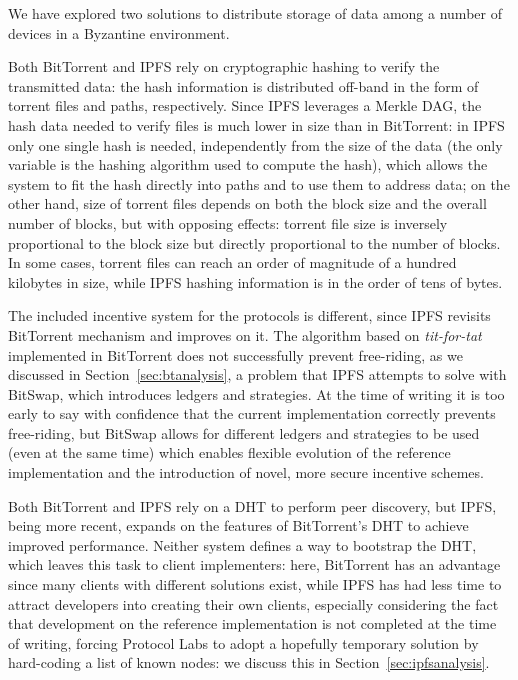 \documentclass[mscthesis]{usiinfthesis}
\begin{document}
We have explored two solutions to distribute storage of data among a number of devices in a Byzantine environment.

Both BitTorrent and IPFS rely on cryptographic hashing to verify the transmitted data: the hash information is distributed off-band in the form of torrent files and paths, respectively. Since IPFS leverages a Merkle DAG, the hash data needed to verify files is much lower in size than in BitTorrent: in IPFS only one single hash is needed, independently from the size of the data (the only variable is the hashing algorithm used to compute the hash), which allows the system to fit the hash directly into paths and to use them to address data; on the other hand, size of torrent files depends on both the block size and the overall number of blocks, but with opposing effects: torrent file size is inversely proportional to the block size but directly proportional to the number of blocks. In some cases, torrent files can reach an order of magnitude of a hundred kilobytes in size, while IPFS hashing information is in the order of tens of bytes.

The included incentive system for the protocols is different, since IPFS revisits BitTorrent mechanism and improves on it. The algorithm based on \textit{tit-for-tat} implemented in BitTorrent does not successfully prevent free-riding, as we discussed in Section~\ref{sec:btanalysis}, a problem that IPFS attempts to solve with BitSwap, which introduces ledgers and strategies. At the time of writing it is too early to say with confidence that the current implementation correctly prevents free-riding, but BitSwap allows for different ledgers and strategies to be used (even at the same time) which enables flexible evolution of the reference implementation and the introduction of novel, more secure incentive schemes.

Both BitTorrent and IPFS rely on a DHT to perform peer discovery, but IPFS, being more recent, expands on the features of BitTorrent's DHT to achieve improved performance. Neither system defines a way to bootstrap the DHT, which leaves this task to client implementers: here, BitTorrent has an advantage since many clients with different solutions exist, while IPFS has had less time to attract developers into creating their own clients, especially considering the fact that development on the reference implementation is not completed at the time of writing, forcing Protocol Labs to adopt a hopefully temporary solution by hard-coding a list of known nodes: we discuss this in Section~\ref{sec:ipfsanalysis}.
\end{document}
